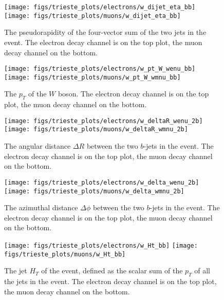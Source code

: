 \begin{figure}[htb]
	\begin{center}
		\leavevmode
		\texttt{[image: figs/trieste\_plots/electrons/w\_dijet\_eta\_bb]}
		\texttt{[image: figs/trieste\_plots/muons/w\_dijet\_eta\_bb]}
	\end{center}
	\caption{The pseudorapidity of the four-vector sum of the two jets in the event. 
          The electron decay channel is on the top plot, 
          the muon decay channel on the bottom.}
	\label{fig:dijeteta}
\end{figure}

\begin{figure}[htb]
	\begin{center}
		\leavevmode
		\texttt{[image: figs/trieste\_plots/electrons/w\_pt\_W\_wenu\_bb]}
		\texttt{[image: figs/trieste\_plots/muons/w\_pt\_W\_wmnu\_bb]}
	\end{center}
	\caption{The $p_{T}$ of the $W$ boson. 
          The electron decay channel is on the top plot, 
          the muon decay channel on the bottom.}
	\label{fig:Wpt}
\end{figure}

\begin{figure}[htb]
	\begin{center}
		\leavevmode
		\texttt{[image: figs/trieste\_plots/electrons/w\_deltaR\_wenu\_2b]}
		\texttt{[image: figs/trieste\_plots/muons/w\_deltaR\_wmnu\_2b]}
	\end{center}
	\caption{The angular distance $\Delta R$ between the two $b$-jets in the event. 
          The electron decay channel is on the top plot, 
          the muon decay channel on the bottom.}
	\label{fig:bjetDeltaR}
\end{figure}

\begin{figure}[htb]
	\begin{center}
		\leavevmode
		\texttt{[image: figs/trieste\_plots/electrons/w\_delta\_wenu\_2b]}
		\texttt{[image: figs/trieste\_plots/muons/w\_delta\_wmnu\_2b]}
	\end{center}
	\caption{The azimuthal distance $\Delta\phi$ between the two $b$-jets in the event. 
          The electron decay channel is on the top plot, 
          the muon decay channel on the bottom.}
	\label{fig:bjetDeltaPhi}
\end{figure}

\begin{figure}[htb]
	\begin{center}
		\leavevmode
		\texttt{[image: figs/trieste\_plots/electrons/w\_Ht\_bb]}
		\texttt{[image: figs/trieste\_plots/muons/w\_Ht\_bb]}
	\end{center}
	\caption{The jet $H_{T}$ of the event, defined as the scalar sum of the 
          $p_{T}$ of all the jets in the event. 
          The electron decay channel is on the top plot, 
          the muon decay channel on the bottom.}
	\label{fig:jetHt}
\end{figure}
